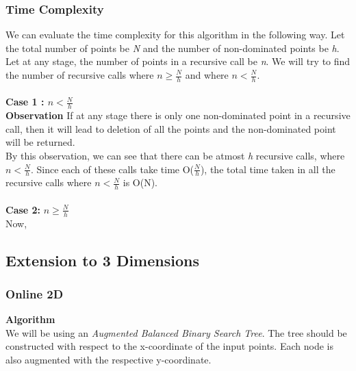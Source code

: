 \documentclass{article}
\begin{document}
\subsubsection{Time Complexity}
We can evaluate the time complexity for this algorithm in the following way. Let the total number of points be \emph{N} and the number of non-dominated points be \emph{h}. Let at any stage, the number of points in a recursive call be \emph{n}. We will try to find the number of recursive calls where $n \geq \frac{N}{h}$ and where $n < \frac{N}{h}$. \\ \\
\textbf{ Case 1 : $n < \frac{N}{h}$} \\
\textbf{Observation} If at any stage there is only one non-dominated point in a recursive call, then it will lead to deletion of all the points and the non-dominated point will be returned. \\
By this observation, we can see that there can be atmost \emph{h} recursive calls, where $n < \frac{N}{h}$. Since each of these calls take time O($\frac{N}{h}$), the total time taken in all the recursive calls where $n < \frac{N}{h}$ is O(N).\\ \\
\textbf{Case 2:} $n \geq \frac{N}{h}$ \\
Now, 



\subsection{Extension to 3 Dimensions}
\subsubsection{Online 2D}
\textbf{Algorithm} \\
We will be using an \emph{Augmented Balanced Binary Search Tree}. The tree should be constructed with respect to the x-coordinate of the input points. Each node is also augmented with the respective y-coordinate. \\
\end{document}
